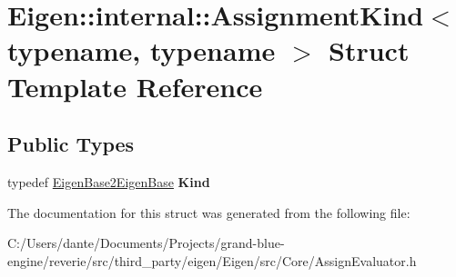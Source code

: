\hypertarget{struct_eigen_1_1internal_1_1_assignment_kind}{}\section{Eigen\+::internal\+::Assignment\+Kind$<$ typename, typename $>$ Struct Template Reference}
\label{struct_eigen_1_1internal_1_1_assignment_kind}
\subsection*{Public Types}
\begin{DoxyCompactItemize}
\item 
\mbox{\label{struct_eigen_1_1internal_1_1_assignment_kind_a18fda331c81a14c0764198df6851d6d1}} 
typedef \mbox{\hyperlink{struct_eigen_1_1internal_1_1_eigen_base2_eigen_base}{Eigen\+Base2\+Eigen\+Base}} {\bfseries Kind}
\end{DoxyCompactItemize}


The documentation for this struct was generated from the following file\+:\begin{DoxyCompactItemize}
\item 
C\+:/\+Users/dante/\+Documents/\+Projects/grand-\/blue-\/engine/reverie/src/third\+\_\+party/eigen/\+Eigen/src/\+Core/Assign\+Evaluator.\+h\end{DoxyCompactItemize}
